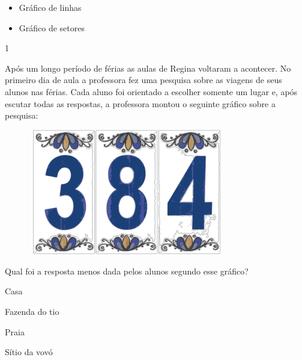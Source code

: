 \begin{multicols}{2}
{\begin{escolha}
{\begin{itemize}
\item
  Gráfico de linhas
\end{itemize}



\begin{itemize}
\item
  Gráfico de setores
\end{itemize}





\num{1}

Após um longo período de férias as aulas de Regina voltaram a acontecer.
No primeiro dia de aula a professora fez uma pesquisa sobre as viagens de seus alunos nas férias. Cada aluno foi
orientado a escolher somente um lugar e, após escutar todas as respostas,
a professora montou o seguinte gráfico sobre a pesquisa:

\includegraphics[width=4.23077in,height=2.15071in]{media/image92.png}

Qual foi a resposta menos dada pelos alunos segundo esse gráfico?

\begin{escolha}
\item
  Casa
\item
  Fazenda do tio
\item
  Praia
\item
  Sítio da vovó
\end{escolha}

}
\end{escolha}}
\end{multicols}

